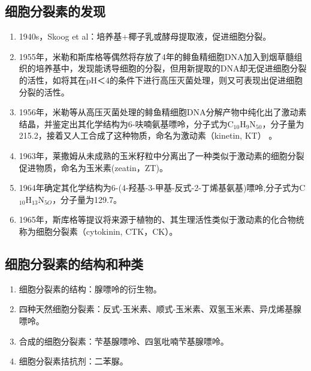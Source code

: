 \subsection{细胞分裂素的发现}
\begin{enumerate}
    \item 1940s，Skoog et al：培养基+椰子乳或酵母提取液，促进细胞分裂。
    \item 1955年，米勒和斯库格等偶然将存放了4年的鲱鱼精细胞DNA加入到烟草髓组织的培养基中，发现能诱导细胞的分裂，但用新提取的DNA却无促进细胞分裂的活性，如将其在pH＜4的条件下进行高压灭菌处理，则又可表现出促进细胞分裂的活性。
    \item 1956年，米勒等从高压灭菌处理的鲱鱼精细胞DNA分解产物中纯化出了激动素结晶，并鉴定出其化学结构为6-呋喃氨基嘌呤，分子式为C$_{10}$H$_9$N$_{50}$，分子量为215.2，接着又人工合成了这种物质，命名为激动素（kinetin, KT） 。
    \item 1963年，莱撒姆从未成熟的玉米籽粒中分离出了一种类似于激动素的细胞分裂促进物质，命名为玉米素(zeatin，ZT)。
    \item 1964年确定其化学结构为6-(4-羟基-3-甲基-反式-2-丁烯基氨基)嘌呤,分子式为C$_{10}$H$_{13}$N$_{5O}$，分子量为129.7。
    \item 1965年，斯库格等提议将来源于植物的、其生理活性类似于激动素的化合物统称为细胞分裂素（cytokinin, CTK，CK）。
\end{enumerate}
\subsection{细胞分裂素的结构和种类}
\begin{enumerate}
    \item 细胞分裂素的结构：腺嘌呤的衍生物。
    \item 四种天然细胞分裂素：反式-玉米素、顺式-玉米素、双氢玉米素、异戊烯基腺嘌呤。
    \item 合成的细胞分裂素：芐基腺嘌呤、四氢吡喃芐基腺嘌呤。
    \item 细胞分裂素拮抗剂：二苯脲。
\end{enumerate}

